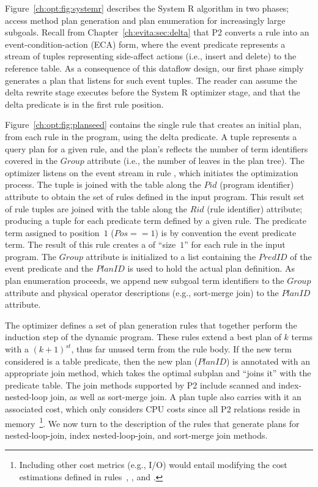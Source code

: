 Figure~\ref{ch:opt:fig:systemr} describes the System R algorithm in two phases;
access method plan generation and plan enumeration for increasingly large
subgoals.  Recall from Chapter~\ref{ch:evita:sec:delta} that P2 converts a rule
into an event-condition-action (ECA) form, where the event predicate represents
a stream of tuples representing side-affect actions (i.e., insert and delete)
to the reference table.  As a consequence of this dataflow design, our first
phase simply generates a plan that listens for such event tuples.  The reader
can assume the delta rewrite stage executes before the System R optimizer
stage, and that the delta predicate is in the first rule position.

Figure~\ref{ch:opt:fig:planseed} contains the single rule that creates an
initial plan, from each rule in the program, using the delta predicate.  A
 tuple represents a query plan for a given rule, and the plan's
 reflects the number of term identifiers covered in the $Group$
attribute (i.e., the number of leaves in the plan tree).  The optimizer listens
on the  event stream in rule , which
initiates the optimization process.  The  tuple is
joined with the  table along the $Pid$ (program identifier)
attribute to obtain the set of rules defined in the input program.  This result
set of rule tuples are joined with the  table along the
$Rid$ (rule identifier) attribute; producing a tuple for each predicate term
defined by a given rule.  The predicate term assigned to position~$1$ ($Pos ==
1$) is by convention the event predicate term.  The result of this rule creates 
a  of ``size~$1$'' for each rule in the input program.  The
$Group$ attribute is initialized to a list containing the $PredID$ of the event
predicate and the $PlanID$ is used to hold the actual plan definition.  As plan
enumeration proceeds, we append new subgoal term identifiers to the $Group$
attribute and physical operator descriptions (e.g., sort-merge join) to the
$PlanID$ attribute.

The \OVERLOG optimizer defines a set of plan generation rules that together
perform the induction step of the dynamic program.  These rules extend a best
plan of $k$ terms with a $(k+1)^{st}$, thus far unused term from the rule body.
If the new term considered is a table predicate, then the new plan ($PlanID$)
is annotated with an appropriate join method, which takes the optimal subplan
and ``joins it'' with the predicate table.  The join methods supported by P2
include scanned and index-nested-loop join, as well as sort-merge join.  A plan
tuple also carries with it an associated cost, which only considers CPU costs
since all P2 relations reside in memory~\footnote{Including other cost metrics
(e.g., I/O) would entail modifying the cost estimations defined in
rules~, , and .}.  We now turn to the description of
the rules that generate plans for nested-loop-join, index nested-loop-join, and
sort-merge join methods.

